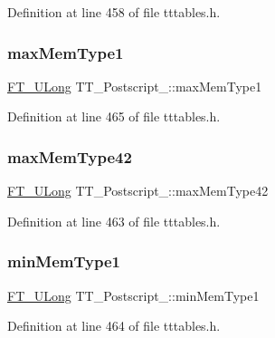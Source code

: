 Definition at line 458 of file tttables.\+h.

\mbox{\label{struct_t_t___postscript___a944a3df5127262db0f7ae92868defb99}} 
\subsubsection{\texorpdfstring{maxMemType1}{maxMemType1}}
{\footnotesize\ttfamily \mbox{\hyperlink{fttypes_8h_a4fac88bdba78eb76b505efa6e4fbf3f5}{F\+T\+\_\+\+U\+Long}} T\+T\+\_\+\+Postscript\+\_\+\+::max\+Mem\+Type1}



Definition at line 465 of file tttables.\+h.

\mbox{\label{struct_t_t___postscript___a70c4ba372d04e686208f0fede9885314}} 
\subsubsection{\texorpdfstring{maxMemType42}{maxMemType42}}
{\footnotesize\ttfamily \mbox{\hyperlink{fttypes_8h_a4fac88bdba78eb76b505efa6e4fbf3f5}{F\+T\+\_\+\+U\+Long}} T\+T\+\_\+\+Postscript\+\_\+\+::max\+Mem\+Type42}



Definition at line 463 of file tttables.\+h.

\mbox{\label{struct_t_t___postscript___a91a8b40f60e67a1920209e6b08355848}} 
\subsubsection{\texorpdfstring{minMemType1}{minMemType1}}
{\footnotesize\ttfamily \mbox{\hyperlink{fttypes_8h_a4fac88bdba78eb76b505efa6e4fbf3f5}{F\+T\+\_\+\+U\+Long}} T\+T\+\_\+\+Postscript\+\_\+\+::min\+Mem\+Type1}



Definition at line 464 of file tttables.\+h.

\mbox{\label{struct_t_t___postscript___ad78af4931654c197d4a8d0f04d473885}} 
